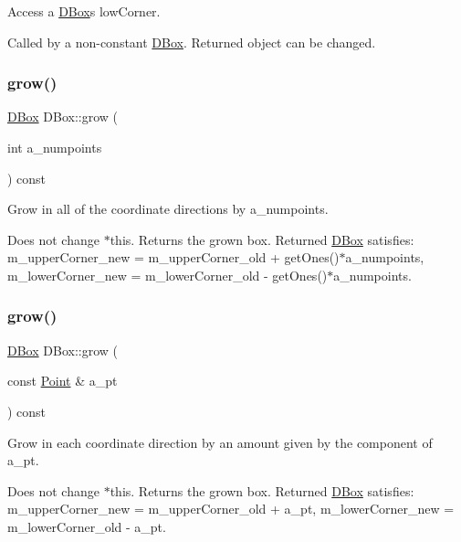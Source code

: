 Access a \hyperlink{class_d_box}{D\+Box}\textquotesingle{}s low\+Corner. 

Called by a non-\/constant \hyperlink{class_d_box}{D\+Box}. Returned object can be changed. \mbox{\label{class_d_box_a390a8b999c556c217cb1f0297691180a}} 
\subsubsection{\texorpdfstring{grow()}{grow()}\hspace{0.1cm}{\footnotesize\ttfamily [1/2]}}
{\footnotesize\ttfamily \hyperlink{class_d_box}{D\+Box} D\+Box\+::grow (\begin{DoxyParamCaption}\item[{int}]{a\+\_\+numpoints }\end{DoxyParamCaption}) const}



Grow in all of the coordinate directions by a\+\_\+numpoints. 

Does not change $\ast$this. Returns the grown box. Returned \hyperlink{class_d_box}{D\+Box} satisfies\+: m\+\_\+upper\+Corner\+\_\+new = m\+\_\+upper\+Corner\+\_\+old + get\+Ones()$\ast$a\+\_\+numpoints, m\+\_\+lower\+Corner\+\_\+new = m\+\_\+lower\+Corner\+\_\+old -\/ get\+Ones()$\ast$a\+\_\+numpoints. \mbox{\label{class_d_box_aa764549d6adab28f06409cd769c6b07e}} 
\subsubsection{\texorpdfstring{grow()}{grow()}\hspace{0.1cm}{\footnotesize\ttfamily [2/2]}}
{\footnotesize\ttfamily \hyperlink{class_d_box}{D\+Box} D\+Box\+::grow (\begin{DoxyParamCaption}\item[{const \hyperlink{class_point}{Point} \&}]{a\+\_\+pt }\end{DoxyParamCaption}) const}



Grow in each coordinate direction by an amount given by the component of a\+\_\+pt. 

Does not change $\ast$this. Returns the grown box. Returned \hyperlink{class_d_box}{D\+Box} satisfies\+: m\+\_\+upper\+Corner\+\_\+new = m\+\_\+upper\+Corner\+\_\+old + a\+\_\+pt, m\+\_\+lower\+Corner\+\_\+new = m\+\_\+lower\+Corner\+\_\+old -\/ a\+\_\+pt. \mbox{\label{class_d_box_a311d4205afe6a3454874f6e07ea1e935}} 
